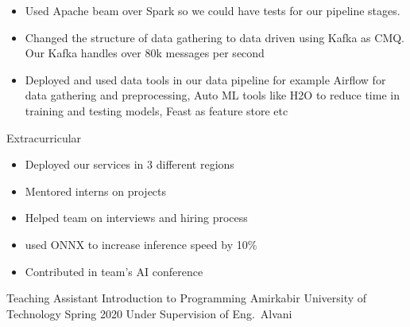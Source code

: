 \begin{cventries}
{\begin{cvitems}
\begin{itemize}
          \item Used Apache beam over Spark so we could have tests for our pipeline stages.
          \item Changed the structure of data gathering to data driven using Kafka as CMQ. Our Kafka handles over 80k messages per second
          \item Deployed and used data tools in our data pipeline for example Airflow for data gathering and preprocessing, Auto ML tools like H2O to reduce time in training and testing models, Feast as feature store etc
        \end{itemize}
        \item Extracurricular
        \begin{itemize}
          \item Deployed our services in 3 different regions 
          \item Mentored interns on projects
          \item Helped team on interviews and hiring process
          \item used ONNX to increase inference speed by 10\%
          \item Contributed in team's AI conference
        \end{itemize}
      \end{cvitems}
    }

\end{cventries}


\begin{cventries}

  \cventry
    {Teaching Assistant} %
    {Introduction to Programming} %
    {Amirkabir University of Technology} %
    {Spring 2020} %
    {Under Supervision of Eng.~Alvani}

\end{cventries}
